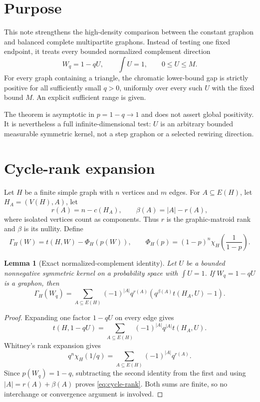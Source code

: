\documentclass[11pt]{article}
\newtheorem{lemma}[theorem]{Lemma}
\begin{document}
\section{Purpose}

This note strengthens the high-density comparison between the constant
graphon and balanced complete multipartite graphons.  Instead of testing one
fixed endpoint, it treats every bounded normalized complement direction
\[
 W_q=1-qU,
 \qquad \int U=1,
 \qquad 0\leq U\leq M.
\]
For every graph containing a triangle, the chromatic lower-bound gap is
strictly positive for all sufficiently small $q>0$, uniformly over every
such $U$ with the fixed bound $M$.  An explicit sufficient range is given.

The theorem is asymptotic in $p=1-q\to1$ and does not assert global
positivity.  It is nevertheless a full infinite-dimensional test: $U$ is an
arbitrary bounded measurable symmetric kernel, not a step graphon or a
selected rewiring direction.

\section{Cycle-rank expansion}

Let $H$ be a finite simple graph with $n$ vertices and $m$ edges.  For
$A\subseteq E(H)$, let $H_A=(V(H),A)$, let
\[
 r(A)=n-c(H_A),\qquad \beta(A)=|A|-r(A),
\]
where isolated vertices count as components.  Thus $r$ is the graphic-matroid
rank and $\beta$ is its nullity.  Define
\[
 \Gamma_H(W)=t(H,W)-\Phi_H(p(W)),
 \qquad
 \Phi_H(p)=(1-p)^n\chi_H\!\left(\frac1{1-p}\right).
\]

\begin{lemma}[Exact normalized-complement identity]
Let $U$ be a bounded nonnegative symmetric kernel on a probability space
with $\int U=1$.  If $W_q=1-qU$ is a graphon, then
\begin{equation}
 \Gamma_H(W_q)
 =\sum_{A\subseteq E(H)}(-1)^{|A|}q^{r(A)}
 \left(q^{\beta(A)}t(H_A,U)-1\right).
 \label{eq:cycle-rank}
\end{equation}
\end{lemma}

\begin{proof}
Expanding one factor $1-qU$ on every edge gives
\[
 t(H,1-qU)=
 \sum_{A\subseteq E(H)}(-1)^{|A|}q^{|A|}t(H_A,U).
\]
Whitney's rank expansion gives
\[
 q^n\chi_H(1/q)
 =\sum_{A\subseteq E(H)}(-1)^{|A|}q^{r(A)}.
\]
Since $p(W_q)=1-q$, subtracting the second identity from the first and using
$|A|=r(A)+\beta(A)$ proves \eqref{eq:cycle-rank}.  Both sums are finite, so
no interchange or convergence argument is involved.
\end{proof}
\end{document}

